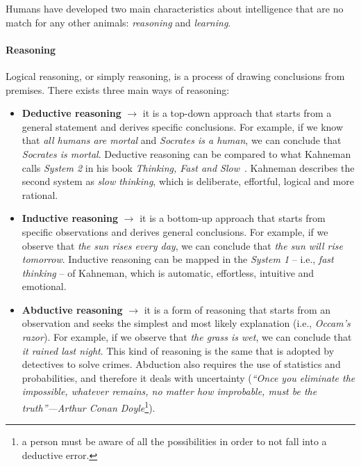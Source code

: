Humans have developed two main characteristics about intelligence that are no match for any other animals: \emph{reasoning} and \emph{learning}.
%
\paragraph{Reasoning}
%
Logical reasoning, or simply reasoning, is a process of drawing conclusions from premises.
%
There exists three main ways of reasoning:
%
\begin{itemize}
    \item \textbf{Deductive reasoning} $\rightarrow$ it is a top-down approach that starts from a general statement and derives specific conclusions.
    For example, if we know that \emph{all humans are mortal} and \emph{Socrates is a human}, we can conclude that \emph{Socrates is mortal}.
    Deductive reasoning can be compared to what Kahneman calls \emph{System 2} in his book \emph{Thinking, Fast and Slow}~\cite{kahneman2011thinking}.
    Kahneman describes the second system as \emph{slow thinking}, which is deliberate, effortful, logical and more rational.
    \item \textbf{Inductive reasoning} $\rightarrow$ it is a bottom-up approach that starts from specific observations and derives general conclusions.
    For example, if we observe that \emph{the sun rises every day}, we can conclude that \emph{the sun will rise tomorrow}.
    Inductive reasoning can be mapped in the \emph{System 1} -- i.e., \emph{fast thinking} -- of Kahneman, which is automatic, effortless, intuitive and emotional.
    \item \textbf{Abductive reasoning} $\rightarrow$ it is a form of reasoning that starts from an observation and seeks the simplest and most likely explanation (i.e., \emph{Occam's razor}).
    For example, if we observe that \emph{the grass is wet}, we can conclude that \emph{it rained last night}.
    This kind of reasoning is the same that is adopted by detectives to solve crimes.
    Abduction also requires the use of statistics and probabilities, and therefore it deals with uncertainty (\emph{``Once you eliminate the impossible, whatever remains, no matter how improbable, must be the truth''---Arthur Conan Doyle}\footnote{a person must be aware of all the possibilities in order to not fall into a deductive error.}).
\end{itemize}


